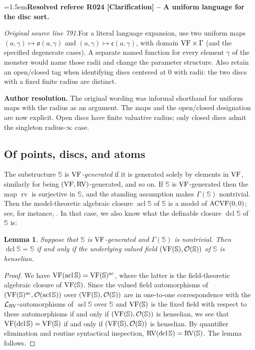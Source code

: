 \documentclass[12pt]{amsart}
\newcommand{\ResolvedRefereeRemark}[5]{%
  \par\medskip\begingroup\normalfont\small\color{gray}%
  \emergencystretch=1.5em\noindent\textbf{Resolved referee R#1 [#2] -- #3.}\par\nobreak\noindent #4\par
  \medskip\color{ResolutionGreen}\noindent\textbf{Author resolution.} #5\par
  \endgroup\medskip
}
\newcommand{\memph}[1]{{\color{magenta}\emph{#1}}}
\theoremstyle{plain}
\newtheorem{lem}[thm]{Lemma}
\theoremstyle{definition}
\theoremstyle{remark}
\numberwithin{equation}{section}
\theoremstyle{plain}
\newcommand{\VF}{\textup{VF}}
\newcommand{\ACVF}{\textup{ACVF}}
\newcommand{\RV}{\textup{RV}}
\newcommand{\OO}{\mdl O}
\DeclareMathOperator{\acl}{acl}
\DeclareMathOperator{\dcl}{dcl}
\DeclareMathOperator{\alg}{ac}
\newcommand{\gc}{\mathfrak{c}}
\newcommand{\go}{\mathfrak{o}}
\newcommand{\0}{\emptyset}
\newcommand{\lan}[3]{\mathcal{L}_{#1 \textup{#2} #3}}
\newcommand{\mdl}[1]{\mathcal{#1}}  %
\newcommand{\bb}[1]{\mathbb{#1}}
\DeclareMathOperator{\rv}{rv}
\begin{document}
\ResolvedRefereeRemark{024}{Clarification}{A uniform language for the disc sort}{%
\textit{Original source line 791.}\quad For a literal language expansion, use two uniform maps $(a,\gamma)\mapsto\go(a,\gamma)$ and $(a,\gamma)\mapsto\gc(a,\gamma)$, with domain $\VF\times\Gamma$ (and the specified degenerate cases). A separate named function for every element $\gamma$ of the monster would name those radii and change the parameter structure. Also retain an open/closed tag when identifying discs centered at $0$ with radii: the two discs with a fixed finite radius are distinct.
}{The original wording was informal shorthand for uniform maps with the radius as an argument. The maps and the open/closed designation are now explicit. Open discs have finite valuative radius; only closed discs admit the singleton radius-$\infty$ case.}



\subsection{Of points, discs, and atoms}
The substructure $\bb S$ is \memph{$\VF$-generated} if it is generated solely by elements in $\VF$, similarly for being $(\VF, \RV)$-generated, and so on. If $\bb S$ is $\VF$-generated then the map $\rv$ is surjective in $\bb S$, and the standing assumption makes $\Gamma(\mathbb S)$ nontrivial. Then the model-theoretic algebraic closure $\acl \mathbb{S}$ of $\mathbb{S}$ is a model of $\ACVF(0,0)$; see, for instance, \cite[Corollary~4.18]{Yin:QE:ACVF:min}. In that case, we also know what the definable closure $\dcl \mathbb{S}$ of $\mathbb{S}$ is:

\begin{lem}\label{cut:to:hensel:substru}
Suppose that $\mathbb{S}$ is $\VF$-generated and $\Gamma(\mathbb{S})$ is nontrivial. Then $\dcl \mathbb{S} = \mathbb{S}$ if and only if the underlying valued field $(\VF(\mathbb{S}), \OO(\mathbb{S}))$ of $\mathbb{S}$ is henselian.
\end{lem}
\begin{proof}
We have $\VF(\acl \mathbb{S}) = \VF(\mathbb{S})^{\alg}$, where the latter is the field-theoretic algebraic closure of $\VF(\mathbb{S})$. Since the valued field automorphisms of $(\VF(\mathbb{S})^{\alg}, \OO(\acl \mathbb{S}))$ over $(\VF(\mathbb{S}), \OO(\mathbb{S}))$ are in one-to-one correspondence with the $\lan{}{RV}{}$-automorphisms of $\acl \mathbb{S}$ over $\mathbb{S}$ and $\VF(\mathbb{S})$ is the fixed field with respect to these automorphisms if and only if $(\VF(\mathbb{S}), \OO(\mathbb{S}))$ is henselian, we see that $\VF (\dcl \mathbb{S}) = \VF(\mathbb{S})$ if and only if $(\VF(\mathbb{S}), \OO(\mathbb{S}))$ is henselian. By quantifier elimination and routine syntactical inspection, $\RV(\dcl \mathbb{S}) = \RV(\mathbb{S}) $.  The lemma follows.
\end{proof}
\end{document}
